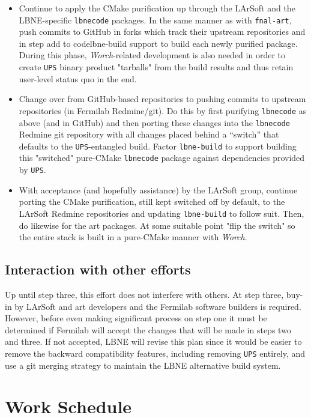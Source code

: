 \documentclass[usletter]{article}
\newcommand{\code}[1]{\texttt{#1}}
\newcommand{\worch}{\textit{Worch}\xspace}
\newcommand{\ups}{\code{UPS}\xspace}
\newcommand{\art}{art\xspace}
\newcommand{\larsoft}{LArSoft\xspace}
\newcommand{\lbnecode}{\code{lbnecode}\xspace}
\begin{document}
\begin{itemize}
	\item Continue to apply the CMake purification up through the LArSoft and the LBNE-specific
    \lbnecode packages. In the same manner as with \code{fnal-art}, push
    commits to GitHub in forks which track their upstream repositories
    and in step add to code{lbne-build} support to build each newly purified
    package. During this phase, \worch-related development is also needed
    in order to create \ups binary product "tarballs" from the build
    results and thus retain user-level status quo in the end.
	\item Change over from GitHub-based repositories to pushing commits to
    upstream repositories (in Fermilab Redmine/git). Do this by first purifying 
    \lbnecode as above (and in GitHub) and then porting these changes into the
    \lbnecode Redmine git repository with all changes placed behind a
    ``switch'' that defaults to the \ups-entangled build. Factor
    \code{lbne-build} to support building this "switched" pure-CMake
    \lbnecode package against dependencies provided by \ups.
	\item With acceptance (and hopefully assistance) by the LArSoft group,
    continue porting the CMake purification, still kept switched off by
    default, to the LArSoft Redmine repositories and updating
    \code{lbne-build} to follow suit. Then, do likewise for the \art
    packages. At some suitable point "flip the switch" so the entire
    stack is built in a pure-CMake manner with \worch.
\end{itemize}


\subsection{Interaction with other efforts}

Up until step three, this effort does not interfere with others. At step
three, buy-in by \larsoft and \art developers and the Fermilab software
builders is required. However, before even making significant process on
step one it must be determined if Fermilab will accept the changes that
will be made in steps two and three. If not accepted, LBNE will revise
this plan  since it would be 
easier to remove the backward compatibility features, including removing \ups entirely, 
and use a git merging strategy to maintain the LBNE alternative build system.

\section{Work Schedule}
\end{document}
